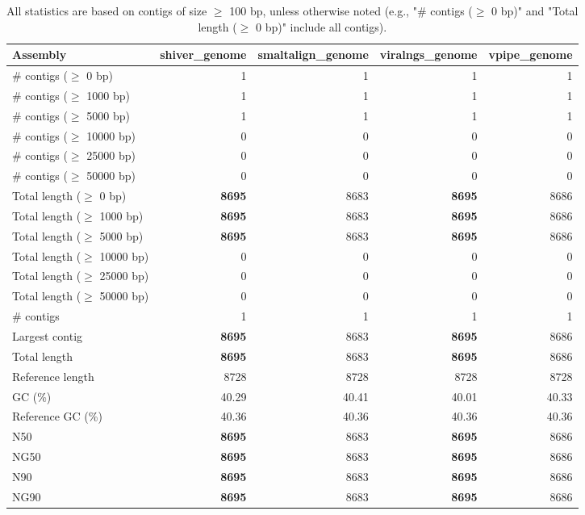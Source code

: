 \documentclass[12pt,a4paper]{article}
\begin{document}
\begin{table}[ht]
\begin{center}
\caption{All statistics are based on contigs of size $\geq$ 100 bp, unless otherwise noted (e.g., "\# contigs ($\geq$ 0 bp)" and "Total length ($\geq$ 0 bp)" include all contigs).}
\begin{tabular}{|l*{4}{|r}|}
\hline
Assembly & shiver\_genome & smaltalign\_genome & viralngs\_genome & vpipe\_genome \\ \hline
\# contigs ($\geq$ 0 bp) & 1 & 1 & 1 & 1 \\ \hline
\# contigs ($\geq$ 1000 bp) & 1 & 1 & 1 & 1 \\ \hline
\# contigs ($\geq$ 5000 bp) & 1 & 1 & 1 & 1 \\ \hline
\# contigs ($\geq$ 10000 bp) & 0 & 0 & 0 & 0 \\ \hline
\# contigs ($\geq$ 25000 bp) & 0 & 0 & 0 & 0 \\ \hline
\# contigs ($\geq$ 50000 bp) & 0 & 0 & 0 & 0 \\ \hline
Total length ($\geq$ 0 bp) & {\bf 8695} & 8683 & {\bf 8695} & 8686 \\ \hline
Total length ($\geq$ 1000 bp) & {\bf 8695} & 8683 & {\bf 8695} & 8686 \\ \hline
Total length ($\geq$ 5000 bp) & {\bf 8695} & 8683 & {\bf 8695} & 8686 \\ \hline
Total length ($\geq$ 10000 bp) & 0 & 0 & 0 & 0 \\ \hline
Total length ($\geq$ 25000 bp) & 0 & 0 & 0 & 0 \\ \hline
Total length ($\geq$ 50000 bp) & 0 & 0 & 0 & 0 \\ \hline
\# contigs & 1 & 1 & 1 & 1 \\ \hline
Largest contig & {\bf 8695} & 8683 & {\bf 8695} & 8686 \\ \hline
Total length & {\bf 8695} & 8683 & {\bf 8695} & 8686 \\ \hline
Reference length & 8728 & 8728 & 8728 & 8728 \\ \hline
GC (\%) & 40.29 & 40.41 & 40.01 & 40.33 \\ \hline
Reference GC (\%) & 40.36 & 40.36 & 40.36 & 40.36 \\ \hline
N50 & {\bf 8695} & 8683 & {\bf 8695} & 8686 \\ \hline
NG50 & {\bf 8695} & 8683 & {\bf 8695} & 8686 \\ \hline
N90 & {\bf 8695} & 8683 & {\bf 8695} & 8686 \\ \hline
NG90 & {\bf 8695} & 8683 & {\bf 8695} & 8686 \\ \hline

\end{tabular}
\end{center}
\end{table}
\end{document}
